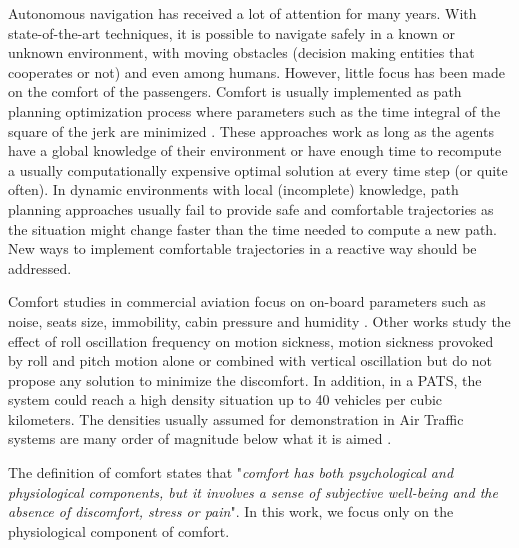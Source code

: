 Autonomous navigation has received a lot of attention for many years. With state-of-the-art techniques, it is possible to navigate safely in a known or unknown environment\cite{scherer_flying_2008}, with moving obstacles (decision making entities that cooperates or not\cite{nordlund_probabilistic_2011}) and even among humans\cite{guzzi_human-friendly_2013}. However, little focus has been made on the comfort of the passengers. Comfort is usually implemented as path planning optimization process where parameters such as the time integral of the square of the jerk are minimized \cite{gulati_framework_2009} \cite{morales_human-comfortable_2013}. These approaches work as long as the agents have a global knowledge of their environment or have enough time to recompute a usually computationally expensive optimal solution at every time step (or quite often). In dynamic environments with local (incomplete) knowledge, path planning approaches usually fail to provide safe and comfortable trajectories as the situation might change faster than the time needed to compute a new path. New ways to implement comfortable trajectories in a reactive way should be addressed. 

Comfort studies in commercial aviation focus on on-board parameters such as noise, seats size, immobility, cabin pressure and humidity \cite{hinninghofen_passenger_2006}. Other works study the effect of roll oscillation frequency on motion sickness\cite{howarth_effect_2003}, motion sickness provoked by roll and pitch motion alone or combined with vertical oscillation\cite{mccauley_motion_1976} \cite{turner_airsickness_2000} but do not propose any solution to minimize the discomfort. In addition, in a PATS, the system could reach a high density situation up to 40 vehicles per cubic kilometers\cite{truman_out_2007}. The densities usually assumed for demonstration in Air Traffic systems are many order of magnitude below what it is aimed\cite{krozel_system_2001} \cite{dowek_provably_2005}. 


The definition of comfort states that "\textit{comfort has both psychological and physiological components, but it involves a sense of subjective well-being and the absence of discomfort, stress or pain}"\cite{richards_psychology_1980}. In this work, we focus only on the physiological component of comfort. 

